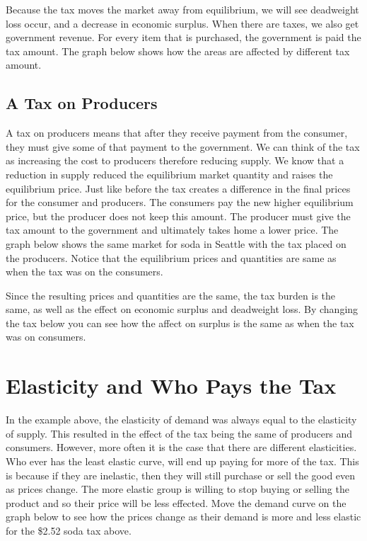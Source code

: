 \documentclass[
]{book}
\begin{document}
Because the tax moves the market away from equilibrium, we will see deadweight loss occur, and a decrease in economic surplus. When there are taxes, we also get government revenue. For every item that is purchased, the government is paid the tax amount. The graph below shows how the areas are affected by different tax amount.

\subsection{A Tax on Producers}\label{a-tax-on-producers}

A tax on producers means that after they receive payment from the consumer, they must give some of that payment to the government. We can think of the tax as increasing the cost to producers therefore reducing supply. We know that a reduction in supply reduced the equilibrium market quantity and raises the equilibrium price. Just like before the tax creates a difference in the final prices for the consumer and producers. The consumers pay the new higher equilibrium price, but the producer does not keep this amount. The producer must give the tax amount to the government and ultimately takes home a lower price. The graph below shows the same market for soda in Seattle with the tax placed on the producers. Notice that the equilibrium prices and quantities are same as when the tax was on the consumers.

Since the resulting prices and quantities are the same, the tax burden is the same, as well as the effect on economic surplus and deadweight loss. By changing the tax below you can see how the affect on surplus is the same as when the tax was on consumers.

\section{Elasticity and Who Pays the Tax}\label{elasticity-and-who-pays-the-tax}

In the example above, the elasticity of demand was always equal to the elasticity of supply. This resulted in the effect of the tax being the same of producers and consumers. However, more often it is the case that there are different elasticities. Who ever has the least elastic curve, will end up paying for more of the tax. This is because if they are inelastic, then they will still purchase or sell the good even as prices change. The more elastic group is willing to stop buying or selling the product and so their price will be less effected. Move the demand curve on the graph below to see how the prices change as their demand is more and less elastic for the \$2.52 soda tax above.
\end{document}
